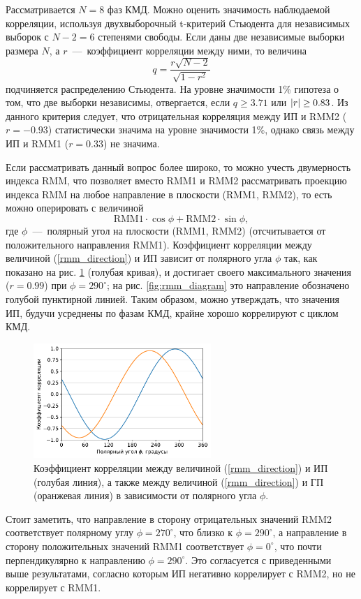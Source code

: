 Рассматривается $N = 8$ фаз КМД. Можно оценить значимость наблюдаемой корреляции, используя двухвыборочный t-критерий Стьюдента для независимых выборок с $N - 2 = 6$ степенями свободы. Если даны две независимые выборки размера $N$, а $r$~---~коэффициент корреляции между ними, то величина
\begin{equation}
 	q = \dfrac{r\sqrt{N-2}}{\sqrt{1-r^2}}
\end{equation}
подчиняется распределению Стьюдента. На уровне значимости 1\% гипотеза о том, что две выборки независимы, отвергается, если $q\ge3.71$ или $\abs{r}\ge0.83$. Из данного критерия следует, что отрицательная корреляция между ИП и RMM2 ($r=-0.93$) статистически значима на уровне значимости 1\%, однако связь между ИП и RMM1 ($r=0.33$) не значима.

Если рассматривать данный вопрос более широко, то можно учесть двумерность индекса RMM, что позволяет вместо RMM1 и RMM2 рассматривать проекцию индекса RMM на любое направление в плоскости (RMM1, RMM2), то есть можно оперировать с величиной 
\begin{equation}\label{rmm_direction}
	\mathrm{RMM1}\cdot \cos\phi + \mathrm{RMM2}\cdot \sin\phi,
\end{equation}
где $\phi$~---~полярный угол на плоскости (RMM1, RMM2) (отсчитывается от положительного направления RMM1). Коэффициент корреляции между величиной (\ref{rmm_direction}) и ИП зависит от полярного угла $\phi$ так, как показано на рис. \ref{fig:r} (голубая кривая), и достигает своего максимального значения ($r=0.99$) при $\phi=290^\circ$; на рис. \ref{fig:rmm_diagram} это направление обозначено голубой пунктирной линией. Таким образом, можно утверждать, что значения ИП, будучи усреднены по фазам КМД, крайне хорошо коррелируют с циклом КМД.

\begin{figure}[htbp]
	\centering
	\includegraphics[width=0.6\textwidth]{figures/r.pdf}
	\caption{Коэффициент корреляции между величиной (\ref{rmm_direction}) и ИП (голубая линия), а также между величиной (\ref{rmm_direction}) и ГП (оранжевая линия) в зависимости от полярного угла $\phi$.}
	\label{fig:r}
\end{figure}

Стоит заметить, что направление в сторону отрицательных значений RMM2 соответствует полярному углу $\phi=270^\circ$, что близко к $\phi=290^\circ$, а направление в сторону положительных значений RMM1 соответствует $\phi=0^\circ$, что почти перпендикулярно к направлению $\phi=290^\circ$. Это согласуется с приведенными выше результатами, согласно которым ИП негативно коррелирует с RMM2, но не коррелирует с RMM1.
